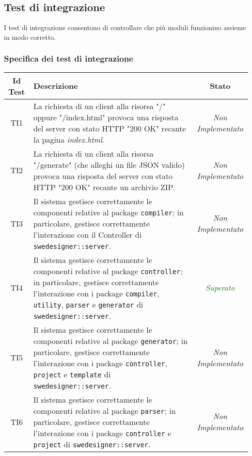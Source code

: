 \subsection{Test di integrazione}
I test di integrazione consentono di controllare che più moduli funzionino assieme in modo corretto.
	
\subsubsection{Specifica dei test di integrazione}
\normalsize
\begin{longtable}{|c|>{}m{8cm}|c|}
\hline 
\textbf{Id Test} & \textbf{Descrizione} & \textbf{Stato}\\
\hline
\endhead
\hypertarget{TI1}{TI1} & La richiesta di un client alla risorsa "/" oppure "/index.html" provoca una risposta del server con stato HTTP "200 OK" recante la pagina \emph{index.html}. & \textit{Non Implementato}\\ \hline
\hypertarget{TI2}{TI2} & La richiesta di un client alla risorsa "/generate" (che alleghi un file JSON valido) provoca una risposta del server con stato HTTP "200 OK" recante un archivio ZIP. & \textit{Non Implementato}\\ \hline
\hypertarget{TI3}{TI3} & Il sistema gestisce correttamente le componenti relative al package \texttt{compiler}; in particolare, gestisce correttamente l'interazione con il Controller di \texttt{swedesigner::server}. & \textit{Non Implementato}\\ \hline
\hypertarget{TI4}{TI4} & Il sistema gestisce correttamente le componenti relative al package \texttt{controller}; in particolare, gestisce correttamente l'interazione con i package \texttt{compiler}, \texttt{utility}, \texttt{parser} e \texttt{generator} di \texttt{swedesigner::server}. & \textcolor{Green}{\textit{Superato}}\\ \hline
\hypertarget{TI5}{TI5} & Il sistema gestisce correttamente le componenti relative al package \texttt{generator}; in particolare, gestisce correttamente l'interazione con i package \texttt{controller}, \texttt{project} e \texttt{template} di \texttt{swedesigner::server}. & \textit{Non Implementato}\\ \hline
\hypertarget{TI6}{TI6} & Il sistema gestisce correttamente le componenti relative al package \texttt{parser}; in particolare, gestisce correttamente l'interazione con i package \texttt{controller} e \texttt{project} di \texttt{swedesigner::server}. & \textit{Non Implementato}\\ \hline

\end{longtable}
